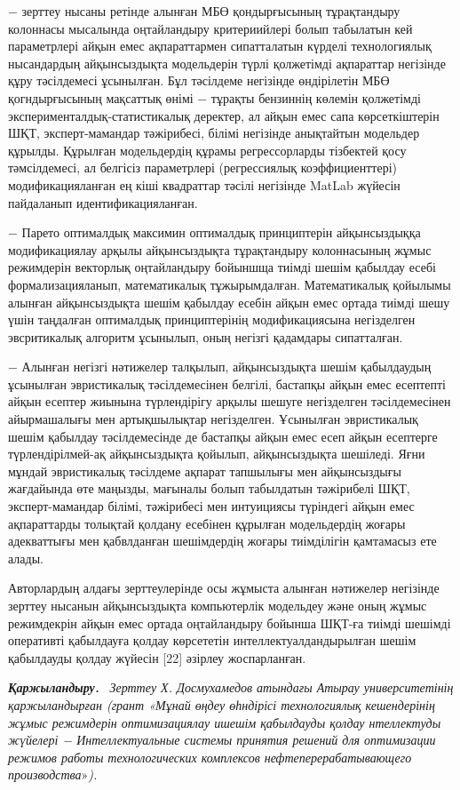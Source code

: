 \begin{multicols}{2}
− зерттеу нысаны ретінде алынған МБӨ қондырғысының тұрақтандыру
колоннасы мысалында оңтайландыру критериийлері болып табылатын кей
параметрлері айқын емес ақпараттармен сипатталатын күрделі технологиялық
нысандардың айқынсыздықта модельдерін түрлі қолжетімді ақпараттар
негізінде құру тәсілдемесі ұсынылған. Бұл тәсілдеме негізінде
өндірілетін МБӨ қогндырғысының мақсаттық өнімі − тұрақты бензиннің
көлемін қолжетімді эксперименталдық-статистикалық деректер, ал айқын
емес сапа көрсеткіштерін ШҚТ, эксперт-мамандар тәжірибесі, білімі
негізінде анықтайтын модельдер құрылды. Құрылған модельдердің құрамы
регрессорларды тізбектей қосу тәмсілдемесі, ал белгісіз параметрлері
(регрессиялық коэффициенттері) модификацияланған ең кіші квадраттар
тәсілі негізінде MatLab жүйесін пайдаланып идентификацияланған.

− Парето оптималдық максимин оптималдық принциптерін айқынсыздыққа
модификациялау арқылы айқынсыздықта тұрақтандыру колоннасының жұмыс
режимдерін векторлық оңтайландыру бойыншща тиімді шешім қабылдау есебі
формализацияланып, математикалық тұжырымдалған. Математикалық қойылымы
алынған айқынсыздықта шешім қабылдау есебін айқын емес ортада тиімді
шешу үшін таңдалған оптималдық принциптерінің модификациясына
негізделген эвсритикалық алгоритм ұсынылып, оның негізгі қадамдары
сипатталған.

− Алынған негізгі нәтижелер талқылып, айқынсыздықта шешім қабылдаудың
ұсынылған эвристикалық тәсілдемесінен белгілі, бастапқы айқын емес
есептепті айқын есептер жиынына түрлендірігу арқылы шешуге негізделген
тәсілдемесінен айырмашалығы мен артықшылықтар негізделген. Ұсынылған
эвристикалық шешім қабылдау тәсілдемесінде де бастапқы айқын емес есеп
айқын есептерге түрлендірілмей-ақ айқынсыздықта қойылып, айқынсыздықта
шешіледі. Яғни мұндай эвристикалық тәсілдеме ақпарат тапшылығы мен
айқынсыздығы жағдайында өте маңызды, мағыналы болып табылдатын
тәжірибелі ШҚТ, эксперт-мамандар білімі, тәжірибесі мен интуициясы
түріндегі айқын емес ақпараттарды толықтай қолдану есебінен құрылған
модельдердің жоғары адекваттығы мен қабвлданған шешімдердің жоғары
тиімділігін қамтамасыз ете алады.

Авторлардың алдағы зерттеулерінде осы жұмыста алынған нәтижелер
негізінде зерттеу нысанын айқынсыздықта компьютерлік модельдеу және оның
жұмыс режимдекрін айқын емес ортада оңтайландыру бойынша ШҚТ-ға тиімді
шешімді оперативті қабылдауға қолдау көрсететін интеллектуалдандырылған
шешім қабылдауды қолдау жүйесін {[}22{]} әзірлеу жоспарланған.

\emph{{\bfseries Қаржыландыру.}} ~\emph{Зерттеу Х. Досмухамедов атындағы
Атырау университетінің қаржыландырған (грант «Мұнай өңдеу өһндірісі
технологиялық кешендерінің жұмыс режимдерін оптимизациялау ишешім
қабылдауды қолдау нтеллектуды жүйелері − Интеллектуальные системы
принятия решений для оптимизации режимов работы технологических
комплексов нефтеперерабатывающего производства}»\emph{).}
\end{multicols}


